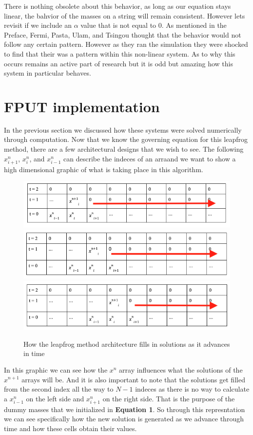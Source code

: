 There is nothing obsolete about this behavior, as long as our equation stays linear, the bahvior of the masses on a string will remain consistent. However lets revisit if we include an $\alpha$ value that is not equal to 0. As mentioned in the Preface, Fermi, Pasta, Ulam, and Tsingou thought that the behavior would not follow any certain pattern. However as they ran the simulation they were shocked to find that their was a pattern within this non-linear system. As to why this occurs remains an active part of research but it is odd but amazing how this system in particular behaves.

\section{FPUT implementation}

In the previous section we discussed how these systems were solved numerically through computation. Now that we know the governing equation for this leapfrog method, there are a few architectural designs that we wish to see. The following $x^{n}_{i+1}$, $x^{n}_{i}$, and $x^{n}_{i-1}$ can describe the indeces of an arraand we want to show a high dimensional graphic of what is taking place in this algorithm. 

\begin{figure}[H]
\centering
\includegraphics[width=.5\textwidth]{figures/array0.png}
\centering
\includegraphics[width=.5\textwidth]{figures/array1.png}
\centering
\includegraphics[width=.5\textwidth]{figures/array2.png}
\caption{How the leapfrog method architecture fills in solutions as it advances in time}
\end{figure}

In this graphic we can see how the $x^{n}$ array influences what the solutions of the $x^{n+1}$ arrays will be. And it is also important to note that the solutions get filled from the second index all the way to $N-1$ indeces as there is no way to calculate a $x^{n}_{i-1}$ on the left side and $x^{n}_{i+1}$ on the right side. That is the purpose of the dummy masses that we initialized in \textbf{Equation 1}. So through this represntation we can see specifically how the new solution is generated as we advance through time and how these cells obtain their values. 

